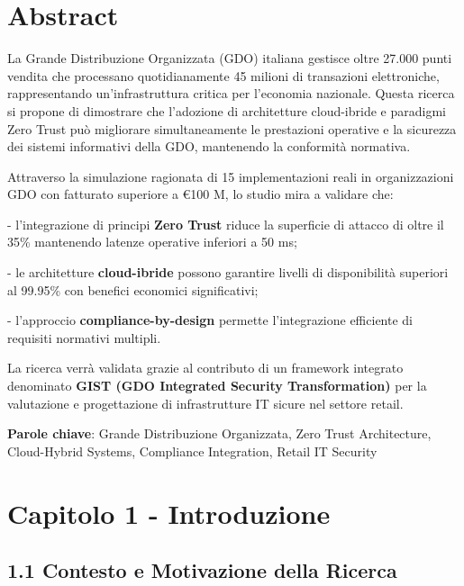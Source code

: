 \documentclass{report}
\begin{document}
\chapter*{Abstract}

La Grande Distribuzione Organizzata (GDO) italiana gestisce oltre 27.000
punti vendita che processano quotidianamente 45 milioni di transazioni
elettroniche, rappresentando un'infrastruttura critica per l'economia
nazionale. Questa ricerca si propone di dimostrare che l'adozione di
architetture cloud-ibride e paradigmi Zero Trust può migliorare
simultaneamente le prestazioni operative e la sicurezza dei sistemi
informativi della GDO, mantenendo la conformità normativa.

Attraverso la simulazione ragionata di 15 implementazioni reali in organizzazioni GDO
con fatturato superiore a €100 M, lo studio mira a validare che:

- l'integrazione di principi \textbf{Zero Trust} riduce la superficie di attacco
di oltre il 35\% mantenendo latenze operative inferiori a 50 ms;

- le architetture \textbf{cloud-ibride} possono garantire livelli di
disponibilità superiori al 99.95\% con benefici economici significativi;

- l'approccio \textbf{compliance-by-design} permette l'integrazione efficiente di
requisiti normativi multipli.

La ricerca verrà validata grazie al contributo di un framework integrato denominato \textbf{GIST (GDO
Integrated Security Transformation)} per la valutazione e progettazione
di infrastrutture IT sicure nel settore retail.

\textbf{Parole chiave}: Grande Distribuzione Organizzata, Zero Trust
Architecture, Cloud-Hybrid Systems, Compliance Integration, Retail IT
Security

\chapter{\texorpdfstring{\textbf{Capitolo 1 -
Introduzione}}{Capitolo 1 - Introduzione}}\label{capitolo-1---introduzione}

\section{\texorpdfstring{\textbf{1.1 Contesto e Motivazione della
Ricerca}}{1.1 Contesto e Motivazione della Ricerca}}\label{contesto-e-motivazione-della-ricerca}
\end{document}
